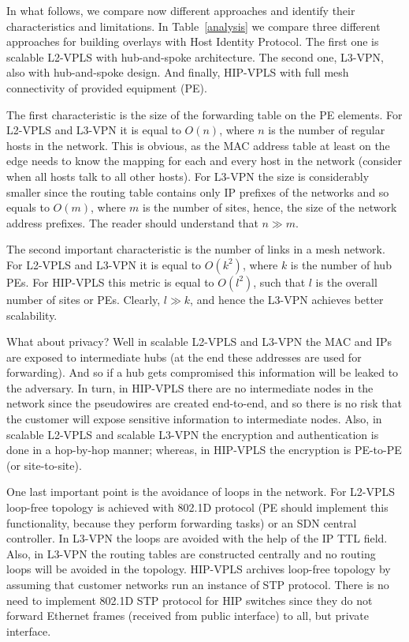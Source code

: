 In what follows, we compare now different approaches and identify their
characteristics and limitations. In Table~\ref{analysis} we 
compare three different approaches for building overlays with Host 
Identity Protocol. The first one is scalable L2-VPLS with hub-and-spoke
architecture. The second one, L3-VPN, also with hub-and-spoke 
design. And finally, HIP-VPLS with full mesh connectivity of provided equipment (PE).

The first characteristic is the size of the forwarding table on the PE elements. For 
L2-VPLS and L3-VPN it is equal to $O(n)$, where $n$ is the number of regular hosts in the
network. This is obvious, as the MAC address table at least on the edge needs to know
the mapping for each and every host in the network (consider when all hosts talk to 
all other hosts). For L3-VPN the size is considerably smaller since the routing table
contains only IP prefixes of the networks and so equals to $O(m)$, where $m$ is the number 
of sites, hence, the size of the network address prefixes. The reader should understand
that $n \gg m$.

The second important characteristic is the number of links in a mesh network. For L2-VPLS 
and L3-VPN it is equal to $O(k^2)$, where $k$ is the number of hub PEs. For HIP-VPLS
this metric is equal to $O(l^2)$, such that $l$ is the overall number of sites or PEs.
Clearly, $l \gg k$, and hence the L3-VPN achieves better scalability.

What about privacy? Well in scalable L2-VPLS and L3-VPN the MAC and IPs are exposed to intermediate hubs 
(at the end these addresses are used for forwarding). And so if a hub gets compromised 
this information will be leaked to the adversary. In turn, in HIP-VPLS there are no intermediate nodes
in the network since the pseudowires are created end-to-end, and so there is no risk that the 
customer will expose sensitive information to intermediate nodes. Also, in scalable L2-VPLS and scalable L3-VPN 
the encryption and authentication is done in a hop-by-hop manner; whereas, in HIP-VPLS the 
encryption is PE-to-PE (or site-to-site). 

One last important point is the avoidance of loops in the network. For L2-VPLS loop-free topology
is achieved with 802.1D protocol (PE should implement this functionality, because they perform forwarding
tasks) or an SDN central controller. In L3-VPN the loops are avoided with the help of the IP TTL field. 
Also, in L3-VPN the routing tables are constructed centrally and no routing loops will be avoided 
in the topology. HIP-VPLS archives loop-free topology by assuming that customer networks run an 
instance of STP protocol. There is no need to implement 802.1D STP protocol for HIP switches
since they do not forward Ethernet frames (received from public interface) to all, 
but private interface.

